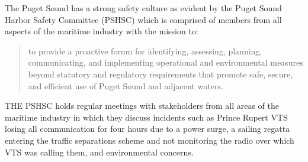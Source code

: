 \documentclass[twoside,symmetric,notoc]{tufte-book}
\begin{document}
\par{%
The Puget Sound has a strong safety culture as evident by the Puget Sound Harbor Safety Committee (PSHSC) which is comprised of members from all aspects of the maritime industry with the mission to:
\begin{quotation}
to provide a proactive forum for identifying, assessing, planning, communicating, and implementing operational and environmental measures beyond statutory and regulatory requirements that promote safe, secure, and efficient use of Puget Sound and adjacent waters.\cite{Ecology}
\end{quotation}
THE PSHSC holds regular meetings with stakeholders from all areas of the maritime industry in which they discuss incidents such as Prince Rupert VTS losing all communication for four hours due to a power surge, a sailing regatta entering the traffic separations scheme and not monitoring the radio over which VTS was calling them, and environmental concerns.
}
\end{document}
